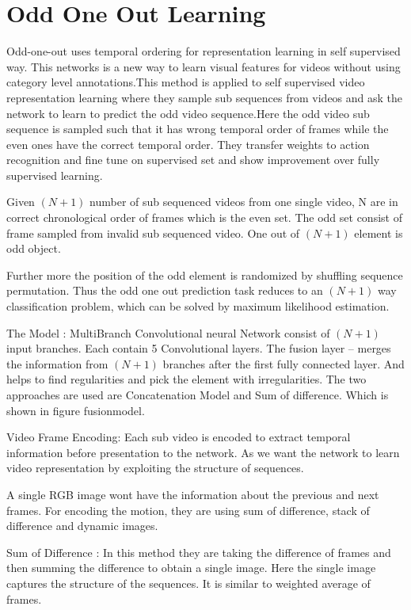 \section{Odd One Out Learning}

Odd-one-out uses temporal ordering for representation learning in self supervised way.
This networks is a new way to learn visual features for videos without using category level annotations.This method is applied to self supervised video representation learning where they sample sub sequences from videos and ask the network to learn to predict the odd video sequence.Here the odd video sub sequence is sampled such that it has wrong temporal order of frames while the even ones have the correct temporal order. 
They transfer weights to action recognition and fine tune on supervised set and show improvement over fully supervised learning.

Given $(N+1)$ number of sub sequenced videos from one single video, N are in correct chronological order of frames which is the even set. The odd set consist of frame sampled from invalid sub sequenced video. One out of $(N+1)$ element is odd object.

Further more the position of the odd element is randomized by shuffling sequence permutation.
Thus the odd one out prediction task reduces to an $(N+1)$ way classification problem, which can be solved by maximum likelihood estimation. 

The Model :  MultiBranch Convolutional neural Network consist of $(N+1)$ input branches. 
Each contain 5 Convolutional layers. 
The fusion layer -- merges the information from $(N+1)$ branches after the first fully connected layer. And helps to find regularities and pick the element with irregularities. The two approaches are used are Concatenation Model and Sum of difference. Which is shown in figure fusionmodel.

Video Frame Encoding: Each sub video is encoded to extract temporal information before presentation to the network. As we want the network to learn video representation by exploiting the structure of sequences. 

A single RGB image wont have the information about the previous and next frames. For encoding the motion, they are using sum of difference, stack of difference and dynamic images.

Sum of Difference : In this method they are taking the difference of frames and then summing the difference to obtain a single image. Here the single image captures the structure of the sequences. 
It is similar to weighted average of frames.

